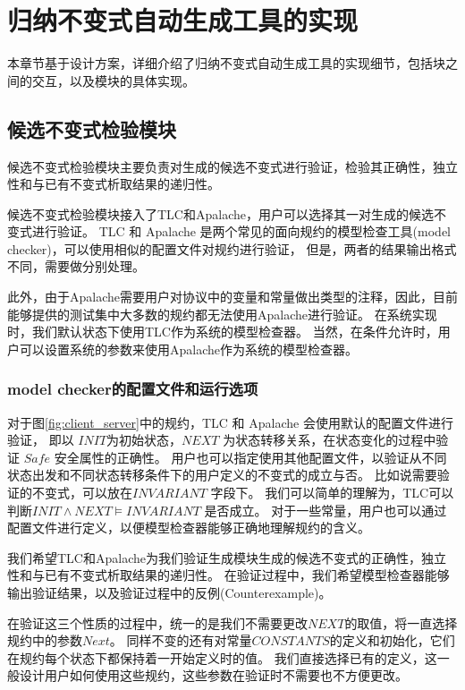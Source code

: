 \chapter{归纳不变式自动生成工具的实现}\label{chap:implementation}

本章节基于设计方案，详细介绍了归纳不变式自动生成工具的实现细节，包括块之间的交互，以及模块的具体实现。

\section{候选不变式检验模块}

候选不变式检验模块主要负责对生成的候选不变式进行验证，检验其正确性，独立性和与已有不变式析取结果的递归性。

候选不变式检验模块接入了TLC和Apalache，用户可以选择其一对生成的候选不变式进行验证。
TLC 和 Apalache 是两个常见的面向\TLA 规约的模型检查工具(model checker)，可以使用相似的配置文件对规约进行验证，
但是，两者的结果输出格式不同，需要做分别处理。

此外，由于Apalache需要用户对协议中的变量和常量做出类型的注释，因此，目前能够提供的测试集中大多数的规约都无法使用Apalache进行验证。
在系统实现时，我们默认状态下使用TLC作为系统的模型检查器。
当然，在条件允许时，用户可以设置系统的参数来使用Apalache作为系统的模型检查器。

\subsection{model checker的配置文件和运行选项}

对于图\ref{fig:client_server}中的规约，TLC 和 Apalache 会使用默认的配置文件进行验证，
即以 $INIT$为初始状态，$NEXT$ 为状态转移关系，在状态变化的过程中验证 $Safe$ 安全属性的正确性。
用户也可以指定使用其他配置文件，以验证从不同状态出发和不同状态转移条件下的用户定义的不变式的成立与否。
比如说需要验证的不变式，可以放在$INVARIANT$ 字段下。
我们可以简单的理解为，TLC可以判断$INIT \wedge NEXT \vDash INVARIANT$ 是否成立。
对于一些常量，用户也可以通过配置文件进行定义，以便模型检查器能够正确地理解规约的含义。

我们希望TLC和Apalache为我们验证生成模块生成的候选不变式的正确性，独立性和与已有不变式析取结果的递归性。
在验证过程中，我们希望模型检查器能够输出验证结果，以及验证过程中的反例(Counterexample)。

在验证这三个性质的过程中，统一的是我们不需要更改$NEXT$的取值，将一直选择规约中的参数$Next$。
同样不变的还有对常量$CONSTANTS$的定义和初始化，它们在规约每个状态下都保持着一开始定义时的值。
我们直接选择已有的定义，这一般设计用户如何使用这些规约，这些参数在验证时不需要也不方便更改。

